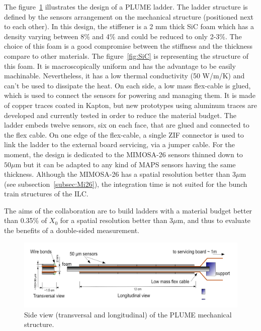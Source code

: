     The figure~\ref{fig:PLUME} illustrates the design of a PLUME ladder.
    The ladder structure is defined by the sensors arrangement on the mechanical structure (positioned next to each other).
    In this design, the stiffener is a 2 mm thick \gls{SiC} foam which has a density varying between 8\% and 4\% and could be reduced to only 2-3\%.
    The choice of this foam is a good compromise between the stiffness and the thickness compare to other materials. 
    The figure~\ref{fig:SiC} is representing the structure of this foam.
    It is macroscopically uniform and has the advantage to be easily machinable.
    Nevertheless, it has a low thermal conductivity (50 W/m/K) and can't be used to dissipate the heat.
    On each side, a low mass flex-cable is glued, which is used to connect the sensors for powering and managing them.
    It is made of copper traces coated in Kapton, but new prototypes using aluminum traces are developed and currently tested in order to reduce the material budget.
    The ladder embeds twelve sensors, six on each face, that are glued and connected to the flex cable.
    On one edge of the flex-cable, a single \gls{ZIF} connector is used to link the ladder to the external board servicing, via a jumper cable.
    For the moment, the design is dedicated to the MIMOSA-26 sensors thinned down to $50 \mu\text{m}$ but it can be adapted to any kind of \gls{MAPS} sensors having the same thickness. 
    Although the MIMOSA-26 has a spatial resolution better than 3$\mu$m (see subsection~\ref{subsec:Mi26}), the integration time is not suited for the bunch train structures of the \gls{ILC}.

    The aims of the collaboration are to build ladders with a material budget better than 0.35\% of $X_0$ for a spatial resolution better than 3$\mu$m, and thus to evaluate the benefits of a double-sided measurement.

    \begin{figure}[!h]
      \centering
      \includegraphics[width = 15 cm]{Pictures/vxd/plume_finalGoal.png}
      \caption{Side view (transversal and longitudinal) of the PLUME mechanical structure.}
      \label{fig:PLUME}
    \end{figure}

